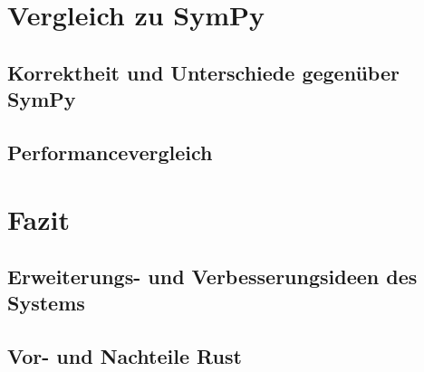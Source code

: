 \documentclass[11pt,a4paper, ngerman]{article}
\begin{document}
\newpage

\section{Vergleich zu SymPy}
\subsection{Korrektheit und Unterschiede gegenüber SymPy}
\subsection{Performancevergleich}

\newpage

\section{Fazit}
\subsection{Erweiterungs- und Verbesserungsideen des Systems}
\subsection{Vor- und Nachteile Rust}


\newpage

\raggedright

\end{document}

